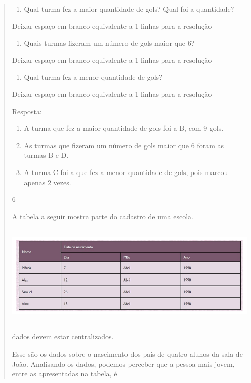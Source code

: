 \begin{mdframed}[linewidth=2pt,linecolor=salmao,roundcorner=2pt]
\begin{itemize}
{\begin{itemize}
\begin{escolha}
{\begin{quote}
{\begin{escolha}
{{{\begin{enumerate}
\item
  Qual turma fez a maior quantidade de gols? Qual foi a quantidade?
\end{enumerate}

Deixar espaço em branco equivalente a 1 linhas para a resolução

\begin{enumerate}
\item
  Quais turmas fizeram um número de gols maior que 6?
\end{enumerate}

Deixar espaço em branco equivalente a 1 linhas para a resolução

\begin{enumerate}
\item
  Qual turma fez a menor quantidade de gols?
\end{enumerate}

Deixar espaço em branco equivalente a 1 linhas para a resolução

Resposta:

\begin{enumerate}
\item
  A turma que fez a maior quantidade de gols foi a B, com 9 gols.
\item
  As turmas que fizeram um número de gols maior que 6 foram as turmas B
  e D.
\item
  A turma C foi a que fez a menor quantidade de gols, pois marcou apenas
  2 vezes.
\end{enumerate}

\num{6}

A tabela a seguir mostra parte do cadastro de uma escola.

\includegraphics[width=5.90556in,height=1.93264in]{media/image98.png}

dados devem estar centralizados.

Esse são os dados sobre o nascimento dos pais de quatro alunos da sala
de João. Analisando os dados, podemos perceber que a pessoa mais jovem,
entre as apresentadas na tabela, é

}}}
\end{escolha}}
\end{quote}}
\end{escolha}
\end{itemize}}
\end{itemize}
\end{mdframed}
